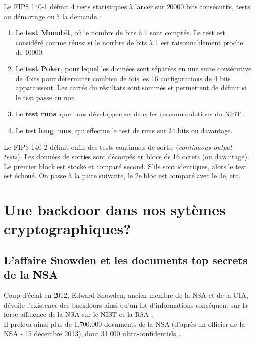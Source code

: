 		
		Le FIPS 140-1 définit 4 tests statistiques à lancer sur 20000 bits consécutifs, 
		tests au démarrage ou à la demande : 
		\begin{enumerate}
		\item Le \textbf{test Monobit}, où le nombre de bits à 1 sont comptés. 
		Le test est considéré comme réussi si le nombre de bits à 1 est 
		raisonnablement proche de 10000.
		\item Le \textbf{test Poker}, pour lequel les données sont séparées en 
		une suite consécutive de 4bits pour déterminer combien de fois les 16 
		configurations de 4 bits apparaissent. Les carrés du résultats sont sommés 
		et permettent de définir si le test passe ou non. 
		\item Le \textbf{test runs}, que nous développerons dans les 
		recommandations du NIST.
		\item Le test \textbf{long runs}, qui effectue le test de runs sur 
		34 bits ou davantage.\\
		\end{enumerate}
		
		
		Le FIPS 140-2 définit enfin des tests continuels de sortie 
		(\textit{continuous output tests}). Les données de sorties sont découpés 
		en blocs de 16 octets (ou davantage). Le premier block est stocké et 
		comparé second. S'ils sont identiques, alors le test est échoué. On passe 
		à la paire suivante, le 2e bloc est comparé avec le 3e, etc.

\section{Une backdoor dans nos sytèmes cryptographiques?}

	\subsection{L'affaire Snowden et les documents top secrets de la NSA}
	
	Coup d'éclat en 2012, Edward Snowden, ancien-membre de la NSA et de
	la CIA,	dévoile l'existence des backdoors ainsi qu'un lot
	d'informations conséquent sur la forte affluence de la NSA
	sur le NIST et la RSA \cite{snowden2013reuters}.\\
	
	Il préleva ainsi plus de 1.700.000 documents de la NSA (d'après un 
	officier de la NSA - 15 décembre 2013), dont 31.000 
	ultra-confidentiels \cite{wikiSnowden}.\\
	
